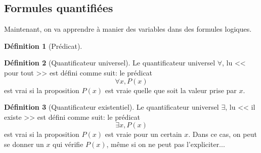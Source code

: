 \documentclass[11pt]{article}
\theoremstyle{definition}
\newtheorem{defn}{Définition}[section]
\theoremstyle{remark}
\begin{document}
\subsection{Formules quantifiées}

Maintenant, on va apprendre à manier des variables dans des formules logiques.

\begin{defn}[Prédicat]

\end{defn}

\begin{defn}[Quantificateur universel]
Le quantificateur universel $\forall$, lu << pour tout >> est défini comme suit: le prédicat
\[ \forall x,P(x)\]
est vrai si la proposition $P(x)$ est vraie quelle que soit la valeur prise par $x$.
\end{defn}

\begin{defn}[Quantificateur existentiel]
Le quantificateur universel $\exists$, lu << il existe >> est défini comme suit: le prédicat
\[ \exists x,P(x)\]
est vrai si la proposition $P(x)$ est vraie pour un certain $x$. Dans ce cas, on peut se donner un $x$ qui vérifie $P(x)$, même si on ne peut pas l'expliciter...
\end{defn}
\end{document}
